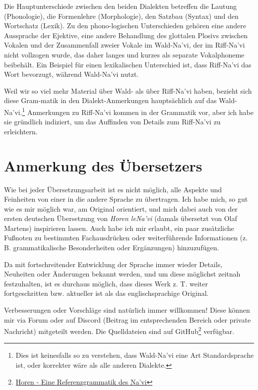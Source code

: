 Die Hauptunterschiede zwischen den beiden Dialekten betreffen die Lautung (Phonologie), die Formenlehre (Morphologie), den Satzbau (Syntax) und den Wortschatz (Lexik). Zu den phono-logischen Unterschieden gehören eine andere Aussprache der Ejektive, eine andere Behandlung des glottalen Plosivs zwischen Vokalen und der Zusammenfall zweier Vokale im Wald-Na'vi, der im Riff-Na'vi nicht vollzogen wurde, das daher langes  und kurzes  als separate Vokalphoneme beibehält. Ein Beispiel für einen lexikalischen Unterschied ist, dass Riff-Na'vi das Wort   bevorzugt, während Wald-Na'vi  nutzt.

Weil wir so viel mehr Material über Wald- als über Riff-Na'vi haben, bezieht sich diese Gram-matik in den Dialekt-Anmerkungen hauptsächlich auf das Wald-Na'vi.\footnote{Dies ist keinesfalls so zu verstehen, dass Wald-Na'vi eine Art Standardsprache ist, oder korrekter wäre als alle anderen Dialekte.} Anmerkungen zu Riff-Na'vi kommen in der Grammatik vor, aber ich habe sie gründlich indiziert, um das Auffinden von Details zum Riff-Na'vi zu erleichtern.

\section{Anmerkung des Übersetzers}
\noindent Wie bei jeder Übersetzungsarbeit ist es nicht möglich, alle Aspekte und Feinheiten von einer in die andere Sprache zu übertragen. Ich habe mich, so gut wie es mir möglich war, am Original orientiert, und mich dabei auch von der ersten deutschen Übersetzung von \textit{Horen leNa'vi} (damals übersetzt von Olaf Martens) inspirieren lassen. Auch habe ich mir erlaubt, ein paar zusätzliche Fußnoten zu bestimmten Fachausdrücken oder weiterführende Informationen (z. B. grammatikalische Besonderheiten oder Ergänzungen) hinzuzufügen.

Da mit fortschreitender Entwicklung der Sprache immer wieder Details, Neuheiten oder Änderungen bekannt werden, und um diese möglichst zeitnah festzuhalten, ist es durchaus möglich, dass dieses Werk z. T. weiter fortgeschritten bzw. aktueller ist als das englischsprachige Original.

Verbesserungen oder Vorschläge sind natürlich immer willkommen! Diese können mir via Forum oder auf Discord (Beitrag im entsprechenden Bereich oder private Nachricht) mitgeteilt werden. Die Quelldateien sind auf GitHub\footnote{\href{https://github.com/Titstewan/horen-de}{Horen - Eine Referenzgrammatik des Na'vi}} verfügbar.

